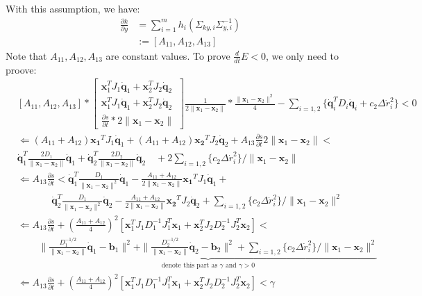 \documentclass[]{article}
\begin{document}
With this assumption, we have:
\begin{align}
\frac{\partial k}{\partial y} &= \sum_{i=1}^{m}h_i(\Sigma_{ky,i}\Sigma^{-1}_{y,i})\\
 & :=[A_{11},A_{12},A_{13}]
\end{align}
Note that $A_{11},A_{12},A_{13}$ are constant values.
To prove $\frac{d}{dt}E<0$, we only need to proove:
\begin{align}
&[A_{11},A_{12},A_{13}]*\begin{bmatrix}
\mathbf{x}_1^TJ_1\mathbf{\dot q}_1+\mathbf{x}_2^TJ_2\mathbf{\dot q}_2\\
\mathbf{x}_1^TJ_1\mathbf{\dot q}_1+\mathbf{x}_2^TJ_2\mathbf{\dot q}_2\\
\frac{\partial s}{\partial t}*2\|\mathbf{x}_1-\mathbf{x}_2\|
\end{bmatrix}\frac{1}{2\|\mathbf{x}_1-\mathbf{x}_2\|}*\frac{\|\mathbf{x}_1-\mathbf{x}_2\|^2}{4}-\sum\limits_{i=1,2}\{\mathbf{\dot{q}}_i^TD_i\mathbf{\dot{q}}_i+c_2\Delta \dot{r}_i^2\}<0\\
&\Leftarrow (A_{11}+A_{12})\mathbf{x_1}^TJ_1\mathbf{\dot q}_1+(A_{11}+A_{12})\mathbf{x_2}^TJ_2\mathbf{\dot q}_2+A_{13}\frac{\partial s}{\partial t}2\|\mathbf{x}_1-\mathbf{x}_2\|< \nonumber\\
&\mathbf{\dot q}_1^T\frac{2D_1}{\|\mathbf{x}_1-\mathbf{x}_2\|}\mathbf{\dot q}_1+\mathbf{\dot q}_2^T\frac{2D_2}{\|\mathbf{x}_1-\mathbf{x}_2\|}\mathbf{\dot q}_2 \quad +2\sum\limits_{i=1,2}\{c_2\Delta \dot{r}_i^2\}/\|\mathbf{x}_1-\mathbf{x}_2\|\\
&\Leftarrow A_{13}\frac{\partial s}{\partial t}<\mathbf{\dot q}_1^T\frac{D_1}{\|\mathbf{x}_1-\mathbf{x}_2\|^2}\mathbf{\dot q}_1-\frac{A_{11}+A_{12}}{2\|\mathbf{x}_1-\mathbf{x}_2\|}\mathbf{x_1}^TJ_1\mathbf{\dot q}_1+ \nonumber\\
&~~~~~~~~~~~~~~~~\mathbf{\dot q}_2^T\frac{D_1}{\|\mathbf{x}_1-\mathbf{x}_2\|^2}\mathbf{\dot q}_2-\frac{A_{11}+A_{12}}{2\|\mathbf{x}_1-\mathbf{x}_2\|}\mathbf{x_2}^TJ_2\mathbf{\dot q}_2+\sum\limits_{i=1,2}\{c_2\Delta \dot{r}_i^2\}/\|\mathbf{x}_1-\mathbf{x}_2\|^2\\
&\Leftarrow A_{13}\frac{\partial s}{\partial t}+ (\frac{A_{11}+A_{12}}{4})^2[\mathbf{x}_1^TJ_1D_1^{-1}J_1^T\mathbf{x}_1+\mathbf{x}_2^TJ_2D_2^{-1}J_2^T\mathbf{x}_2]< \nonumber \\
&~~~~~~~~~~\underbrace{\| \frac{D_1^{-1/2}}{\|\mathbf{x}_1-\mathbf{x}_2\|}\mathbf{\dot q}_1-\mathbf{b}_1\|^2+\| \frac{D_2^{-1/2}}{\|\mathbf{x}_1-\mathbf{x}_2\|}\mathbf{\dot q}_2-\mathbf{b}_2\|^2+\sum\limits_{i=1,2}\{c_2\Delta \dot{r}_i^2\}/\|\mathbf{x}_1-\mathbf{x}_2\|^2}_{\text{denote this part as $\gamma$ and $\gamma>0$}}\\
&\Leftarrow A_{13}\frac{\partial s}{\partial t}+ (\frac{A_{11}+A_{12}}{4})^2[\mathbf{x}_1^TJ_1D_1^{-1}J_1^T\mathbf{x}_1+\mathbf{x}_2^TJ_2D_2^{-1}J_2^T\mathbf{x}_2]< \gamma \label{eqn::proof}
\end{align}
\end{document}
